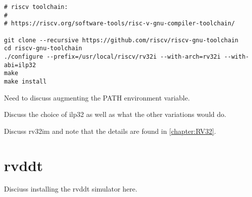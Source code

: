 \begin{verbatim}
# riscv toolchain:
# 
# https://riscv.org/software-tools/risc-v-gnu-compiler-toolchain/

git clone --recursive https://github.com/riscv/riscv-gnu-toolchain
cd riscv-gnu-toolchain
./configure --prefix=/usr/local/riscv/rv32i --with-arch=rv32i --with-abi=ilp32
make
make install
\end{verbatim}

Need to discuss augmenting the PATH environment variable.

Discuss the choice of ilp32 as well as what the other variations would do.

Discuss rv32im and note that the details are found in \autoref{chapter:RV32}.


\section{rvddt}

Disciuss installing the rvddt simulator here.
